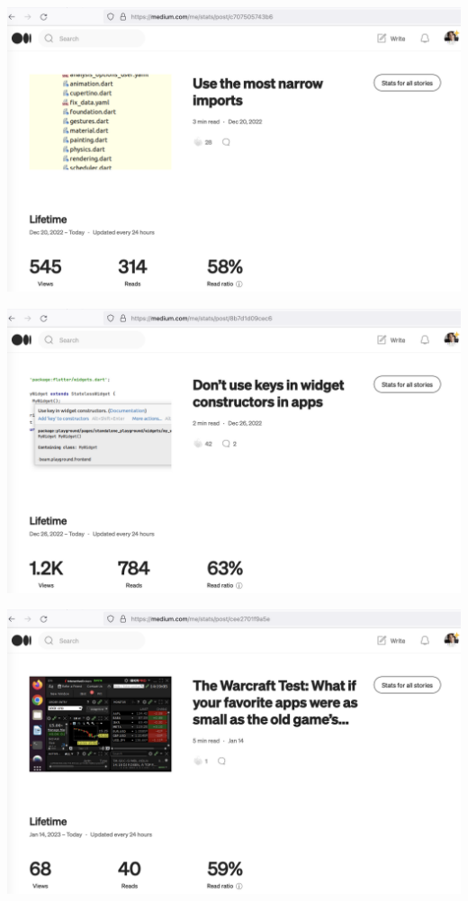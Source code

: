 \begin{center}
    \includegraphics[width=\textwidth]{2022-12-20_imports}
\end{center}

\begin{center}
    \includegraphics[width=\textwidth]{2022-12-26_keys}
\end{center}

\begin{center}
    \includegraphics[width=\textwidth]{2023-01-14_warcraft}
\end{center}


